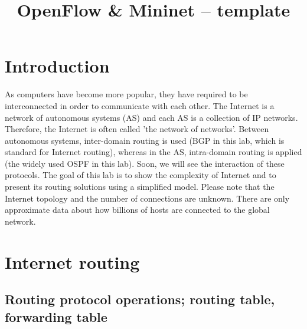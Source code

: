 \documentclass[a4paper]{article}
\title{OpenFlow \& Mininet – template}
\author{}
\date{}
\begin{document}
\maketitle

\tableofcontents

\section{Introduction}
As computers have become more popular, they have required to be interconnected in order to communicate with each other. The Internet is a network of autonomous systems (AS) and each AS is a collection of IP networks. Therefore, the Internet is often called 'the network of networks'. Between autonomous systems, inter-domain routing is used (BGP in this lab, which is standard for Internet routing), whereas in the AS, intra-domain routing is applied (the widely used OSPF in this lab). Soon, we will see the interaction of these protocols. The goal of this lab is to show the complexity of Internet and to present its routing solutions using a simplified model. Please note that the Internet topology and the number of connections are unknown. There are only approximate data about how billions of hosts are connected to the global network.

\section{Internet routing}

\subsection{Routing protocol operations; routing table, forwarding table}
\end{document}

